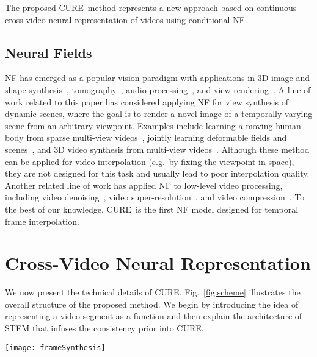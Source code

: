 \documentclass[12pt]{article}
\def\proposed{CURE}
\begin{document}
The proposed \proposed~method represents a new approach based on continuous cross-video neural representation of videos using conditional NF. 

\subsection{Neural Fields}

NF has emerged as a popular vision paradigm with applications in 3D image and shape synthesis~\cite{Chen.etal2019,Park.etal2019,Sitzmann.etal2020}, tomography~\cite{Sun.etal2021a,Liu.Sun.etal2021b,shen2021nerp,lindell2021autoint}, audio processing~\cite{Sitzmann.etal2019}, and view rendering~\cite{Mildenhall.etal2020,Martin.etal2020,Zhang.etal2020}. 
A line of work related to this paper has considered applying NF for view synthesis of dynamic scenes, where the goal is to render a novel image of a temporally-varying scene from an arbitrary viewpoint. 
Examples include learning a moving human body from sparse multi-view videos~\cite{Peng.etal2021}, jointly learning deformable fields and scenes~\cite{li2021neural,Du.etal2021,Park.etal2020}, and 3D video synthesis from multi-view videos~\cite{Li.etal2021neural}. Although these method can be applied for video interpolation (e.g.\ by fixing the viewpoint in space), they are not designed for this task and usually lead to poor interpolation quality.
Another related line of work has applied NF to low-level video processing, including video denoising~\cite{Du.etal2021,Chen.etal2021}, video super-resolution~\cite{Du.etal2021}, and video compression~\cite{Chen.etal2021}. To the best of our knowledge, \proposed~is the first NF model designed for temporal frame interpolation.


\section{Cross-Video Neural Representation}

We now present the technical details of \proposed. Fig.~\ref{fig:scheme} illustrates the overall structure of the proposed method. 
We begin by introducing the idea of representing a video segment as a function and then explain the architecture of STEM that infuses the consistency prior into CURE.

\begin{figure*}[!t]
\centering
\texttt{[image: frameSynthesis]}
\caption{\proposed~represents a video segment as a continuous vector-valued function, which maps  to a single RGB color. The vector  is the local feature code associated with the  region centered at  for the desired frame . 
}
\label{fig:concept}
\end{figure*}
\end{document}
